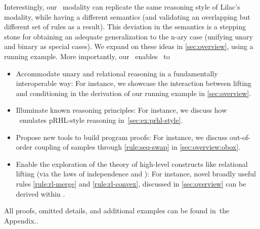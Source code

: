 Interestingly, our \supercond\ modality can replicate the same reasoning
style of Lilac's modality, while having a different semantics
(and validating an overlapping but different set of rules as a result).
This deviation in the semantics is a stepping stone for obtaining an
adequate generalization to the \pre n-ary case (unifying unary and binary as special cases).
We expand on these ideas in \cref{sec:overview}, using a running example.
More importantly, our \supercond\  enables \thelogic\ to
\begin{itemize}
\item Accommodate unary and relational reasoning
  in a fundamentally interoperable way: For instance, we showcase the interaction between lifting and conditioning in the derivation of our running example in \cref{sec:overview}.
\item Illuminate known reasoning principles: For instance, we discuss how \thelogic\ emulates pRHL-style reasoning
  in~\cref{sec:ex:prhl-style}.
\item Propose new tools to build program proofs: For instance, we discuss out-of-order coupling of samples through \ref{rule:seq-swap} in \cref{sec:overview:obox}.\item Enable the exploration of the theory of high-level constructs
   like relational lifting (via the laws of independence and \supercond): For instance, novel broadly useful rules \ref{rule:rl-merge} and \ref{rule:rl-convex}, discussed in \cref{sec:overview} can be derived within \thelogic.
\end{itemize}
All proofs, omitted details, and additional examples can be found in~\ifappendix the Appendix.\else\cite{fullversion}.\fi  \ifappendix\pagebreak\fi

